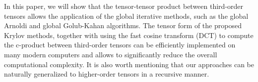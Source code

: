 \documentclass{siamltex}
\newcommand{\1}{\mathbb{1}}
\newcommand{\0}{\mathbb{0}}
\begin{document}
	 In this paper, we will show that the
	tensor-tensor product  between third-order
	tensors allows the application of the global iterative methods, such as the global Arnoldi and global Golub-Kahan algorithms. The tensor form of the proposed Krylov methods, together with using the fast
cosine  transform (DCT) to compute the c-product between third-order
	tensors can be efficiently implemented on many modern computers and allows to significantly reduce the overall computational complexity. It is also worth mentioning that our approaches can be naturally generalized to higher-order tensors in a recursive manner.\\
	
\end{document}
